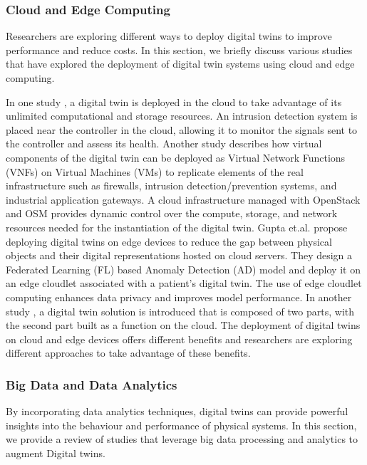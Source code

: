 \subsubsection{Cloud and Edge Computing}
Researchers are exploring different ways to deploy digital twins to improve performance and reduce costs. In this section, we briefly discuss various studies that have explored the deployment of digital twin systems using cloud and edge computing. 

In one study \cite{akbarianSecurityFrameworkDigital2021}, a digital twin is deployed in the cloud to take advantage of its unlimited computational and storage resources. An intrusion detection system is placed near the controller in the cloud, allowing it to monitor the signals sent to the controller and assess its health. Another study \cite{grasselliIndustrialNetworkDigital2022} describes how virtual components of the digital twin can be deployed as Virtual Network Functions (VNFs) on Virtual Machines (VMs) to replicate elements of the real infrastructure such as firewalls, intrusion detection/prevention systems, and industrial application gateways. A cloud infrastructure managed with OpenStack and OSM provides dynamic control over the compute, storage, and network resources needed for the instantiation of the digital twin. Gupta et.al. \cite{guptaHierarchicalFederatedLearning2021} propose deploying digital twins on edge devices to reduce the gap between physical objects and their digital representations hosted on cloud servers. They design a Federated Learning (FL) based Anomaly Detection (AD) model and deploy it on an edge cloudlet associated with a patient's digital twin. The use of edge cloudlet computing enhances data privacy and improves model performance. In another study \cite{saadImplementationIoTBasedDigital2020}, a digital twin solution is introduced that is composed of two parts, with the second part built as a function on the cloud. The deployment of digital twins on cloud and edge devices offers different benefits and researchers are exploring different approaches to take advantage of these benefits.

\subsubsection{Big Data and Data Analytics}
By incorporating data analytics techniques, digital twins can provide powerful insights\cite{jiaqiliSpaceSpiderHyper2022} into the behaviour and performance of physical systems. In this section, we provide a review of studies that leverage big data processing and analytics to augment Digital twins.  
 

